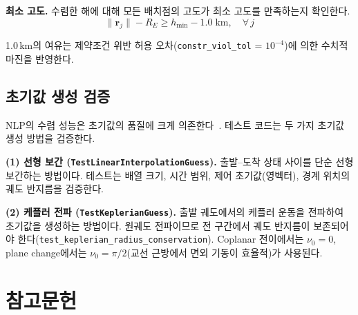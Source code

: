 \documentclass[11pt]{article}
\begin{document}
\textbf{최소 고도.} 수렴한 해에 대해 모든 배치점의 고도가 최소 고도를 만족하는지 확인한다.
\[
\|\mathbf{r}_j\| - R_E \geq h_{\min} - 1.0 \;\text{km}, \quad \forall\, j
\]

1.0\,km의 여유는 제약조건 위반 허용 오차(\texttt{constr\_viol\_tol} = $10^{-4}$)에 의한 수치적 마진을 반영한다.


\subsection{초기값 생성 검증}
\label{sec:guess-test}

NLP의 수렴 성능은 초기값의 품질에 크게 의존한다~\cite{Betts2010}. 테스트 코드는 두 가지 초기값 생성 방법을 검증한다.

\textbf{(1) 선형 보간 (\texttt{TestLinearInterpolationGuess}).} 출발--도착 상태 사이를 단순 선형 보간하는 방법이다. 테스트는 배열 크기, 시간 범위, 제어 초기값(영벡터), 경계 위치의 궤도 반지름을 검증한다.

\textbf{(2) 케플러 전파 (\texttt{TestKeplerianGuess}).} 출발 궤도에서의 케플러 운동을 전파하여 초기값을 생성하는 방법이다. 원궤도 전파이므로 전 구간에서 궤도 반지름이 보존되어야 한다(\texttt{test\_keplerian\_radius\_conservation}). Coplanar 전이에서는 $\nu_0 = 0$, plane change에서는 $\nu_0 = \pi/2$(교선 근방에서 면외 기동이 효율적)가 사용된다.


\section{참고문헌}



\end{document}
